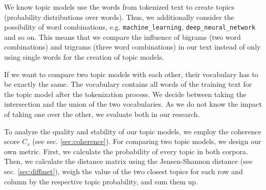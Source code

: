We know topic models use the words from tokenized text to create topics (probability distributions over words). Thus, we additionally consider the possibility of word combinations, e.g. \texttt{machine\_learning},  \texttt{deep\_neural\_network} and so on. This means that we compare the influence of bigrams (two word combinations) and trigrams (three word combinations) in our text instead of only using single words for the creation of topic models.

If we want to compare two topic models with each other, their vocabulary has to be exactly the same. The vocabulary contains all words of the training text for the topic model after the tokenization process. We decide between taking the intersection and the union of the two vocabularies. As we do not know the impact of taking one over the other, we evaluate both in our research. 

To analyze the quality and stability of our topic models, we employ the coherence score $C_v$ (see sec. \ref{sec:coherence}). For comparing two topic models, we design our own metric. First, we calculate the probability of every topic in both corpora. Then, we calculate the distance matrix using the Jensen-Shannon distance (see sec. \ref{sec:diffmet}), weigh the value of the two closest topics for each row and column by the respective topic probability, and sum them up. 